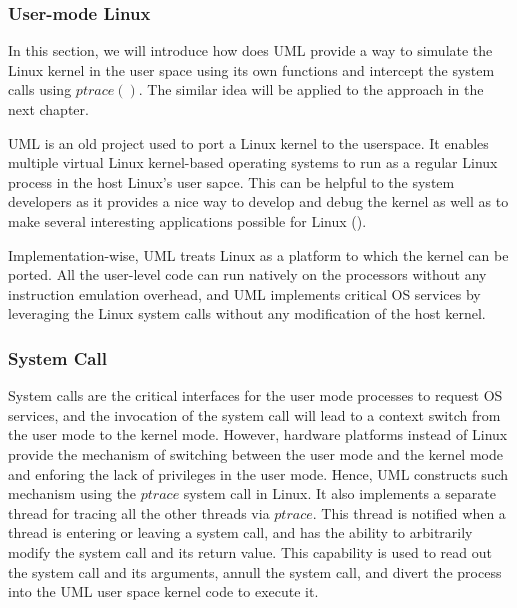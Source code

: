 \subsubsection{User-mode Linux}


In this section, we will introduce how does UML provide a way to simulate the Linux kernel in the user space using its own functions and intercept the system calls using $ptrace()$. The similar idea will be applied to the approach in the next chapter.

UML is an old project used to port a Linux kernel to the userspace. It enables multiple virtual Linux kernel-based operating systems to run as a regular Linux process in the host Linux's user sapce. This can be helpful to the system developers as it provides a nice way to develop and debug the kernel as well as to make several interesting applications possible for Linux (\cite{JD06}). 


Implementation-wise, UML treats Linux as a platform to which the kernel can be ported. All the user-level code can run natively on the processors without any instruction emulation overhead, and UML implements critical OS services by leveraging the Linux system calls without any modification of the host kernel.  

\subsubsection{System Call}


System calls are the critical interfaces for the user mode processes to request OS services, and the invocation of the system call will lead to a context switch from the user mode to the kernel mode. However, hardware platforms instead of Linux provide the mechanism of switching between the user mode and the kernel mode and enforing the lack of privileges in the user mode. Hence, UML constructs such mechanism using the $ptrace$ system call in Linux. It also implements a separate thread for tracing all the other threads via $ptrace$. This thread is notified when a thread is entering or leaving a system call, and has the ability to arbitrarily modify the system call and its return value. This capability is used to read out the system call and its arguments, annull the system call, and divert the process into the UML user space kernel code to execute it.

